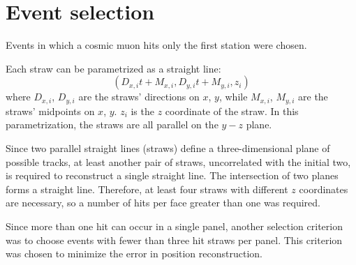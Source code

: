 \section{Event selection}\label{eventselection}
Events in which a cosmic muon hits only the first station were chosen. 

Each straw can be parametrized as a straight line:
\begin{equation}\label{equaretta}
    (D_{x,i}t+M_{x,i},D_{y,i}t+M_{y,i},z_i)
\end{equation}
where $D_{x,i}$, $D_{y,i}$ are the straws' directions on $x$, $y$, while $M_{x,i}$, $M_{y,i}$ are the straws' midpoints on $x$, $y$. $z_i$ is the $z$ coordinate of the straw.
In this parametrization, the straws are all parallel on the $y-z$ plane.

Since two parallel straight lines (straws) define a three-dimensional plane of possible tracks, 
at least another pair of straws, uncorrelated with the initial two, is required to reconstruct a 
single straight line. The intersection of two planes forms a straight line. Therefore, at least four straws with different $z$ coordinates are necessary, 
so a number of hits per face greater than one was required.

Since more than one hit can occur in a single panel, another selection criterion was to choose events 
with fewer than three hit straws per panel. This criterion was chosen to minimize the error in position reconstruction.

